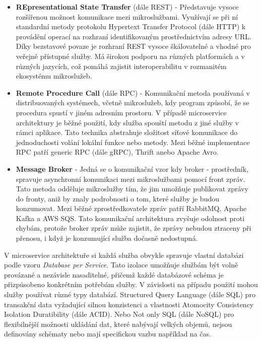 \begin{itemize}
    \item \textbf{REpresentational State Transfer} (dále REST) - Představuje vysoce rozšířenou možnost komunikace mezi mikroslužbami. Využívají se při ní standardní metody protokolu Hypertext Transfer Protocol (dále HTTP) k provádění operací na rozhraní identifikovaným prostřednictvím adresy URL. \cite{Newman2015} Díky bezstavové povaze je rozhraní REST vysoce škálovatelné a vhodné pro veřejně přístupné služby. Má širokou podporu na různých platformách a v různých jazycích, což pomáhá zajistit interoperabilitu v rozmanitém ekosystému mikroslužeb.
    \item \textbf{Remote Procedure Call} (dále RPC) - Komunikační metoda používaná v distribuovaných systémech, včetně mikroslužeb, kdy program způsobí, že se procedura spustí v jiném adresním prostoru. V případě microservice architektury je běžné použití, kdy služba spouští metodu z jiné služby v rámci aplikace. \cite{Sazanavets2022} Tato technika abstrahuje složitost síťové komunikace do jednoduchosti volání lokální funkce nebo metody. Mezi běžné implementace RPC patří generic RPC (dále gRPC), Thrift anebo Apache Avro.
    \item \textbf{Message Broker} - Jedná se o komunikační vzor kdy broker - prostředník, spravuje asynchronní komunikaci mezi mikroslužbami pomocí front zpráv. Tato metoda odděluje mikroslužby tím, že jim umožňuje publikovat zprávy do fronty, aniž by znaly podrobnosti o tom, které služby je budou konzumovat. \cite{Williams2023} Mezi běžné zprostředkovatele zpráv patří RabbitMQ, Apache Kafka a AWS SQS. Tato komunikační architektura zvyšuje odolnost proti chybám, protože broker zpráv může zajistit, že zprávy nebudou ztraceny při přenosu, i když je konzumující služba dočasně nedostupná. 
\end{itemize}


V microservice architektuře si každá služba obvykle spravuje vlastní databázi podle vzoru \emph{Database per Service}. Tato izolace umožňuje službám být volně provázané a nezávisle nasaditelné, přičemž každé databázové schéma je přizpůsobeno konkrétním potřebám služby. \cite{Williams2023} V závislosti na případu použití mohou služby používat různé typy databází. Structured Query Language (dále SQL) pro transakční data vyžadující silnou konzistenci a vlastnosti Atomocity Consistency Isolation Duratibility (dále ACID). Nebo Not only SQL (dále NoSQL) pro flexibilnější možnosti ukládání dat, které nabývají velkých objemů, nejsou definovány schématy nebo mají specifickou vazbu například na čas. 

